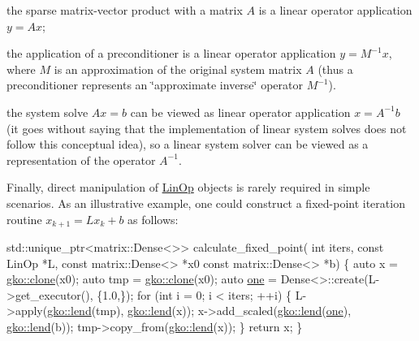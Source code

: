 \begin{DoxyItemize}
\item the sparse matrix-\/vector product with a matrix $A$ is a linear operator application $y = Ax$;
\item the application of a preconditioner is a linear operator application $y = M^{-1}x$, where $M$ is an approximation of the original system matrix $A$ (thus a preconditioner represents an \char`\"{}approximate
    inverse\char`\"{} operator $M^{-1}$).
\item the system solve $Ax = b$ can be viewed as linear operator application $x = A^{-1}b$ (it goes without saying that the implementation of linear system solves does not follow this conceptual idea), so a linear system solver can be viewed as a representation of the operator $A^{-1}$.
\end{DoxyItemize}

Finally, direct manipulation of \hyperlink{classgko_1_1LinOp}{Lin\+Op} objects is rarely required in simple scenarios. As an illustrative example, one could construct a fixed-\/point iteration routine $x_{k+1} = Lx_k + b$ as follows\+:


\begin{DoxyCode}
std::unique\_ptr<matrix::Dense<>> calculate\_fixed\_point(
        \textcolor{keywordtype}{int} iters, \textcolor{keyword}{const} LinOp *L, \textcolor{keyword}{const} matrix::Dense<> *x0
        \textcolor{keyword}{const} matrix::Dense<> *b)
\{
    \textcolor{keyword}{auto} x = \hyperlink{namespacegko_a1beb80750459e4201aa9d882d2d074c3}{gko::clone}(x0);
    \textcolor{keyword}{auto} tmp = \hyperlink{namespacegko_a1beb80750459e4201aa9d882d2d074c3}{gko::clone}(x0);
    \textcolor{keyword}{auto} \hyperlink{namespacegko_a0059e27f8f4bc348ff65c1e60caf47c8}{one} = Dense<>::create(L->get\_executor(), \{1.0,\});
    \textcolor{keywordflow}{for} (\textcolor{keywordtype}{int} i = 0; i < iters; ++i) \{
        L->apply(\hyperlink{namespacegko_aa8cb4876b72e5e1036ea9575443c439b}{gko::lend}(tmp), \hyperlink{namespacegko_aa8cb4876b72e5e1036ea9575443c439b}{gko::lend}(x));
        x->add\_scaled(\hyperlink{namespacegko_aa8cb4876b72e5e1036ea9575443c439b}{gko::lend}(\hyperlink{namespacegko_a0059e27f8f4bc348ff65c1e60caf47c8}{one}), \hyperlink{namespacegko_aa8cb4876b72e5e1036ea9575443c439b}{gko::lend}(b));
        tmp->copy\_from(\hyperlink{namespacegko_aa8cb4876b72e5e1036ea9575443c439b}{gko::lend}(x));
    \}
    \textcolor{keywordflow}{return} x;
\}
\end{DoxyCode}


